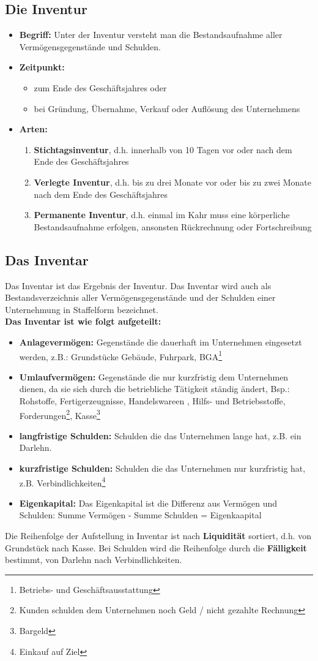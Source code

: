 \documentclass[a4paper,11pt]{scrartcl}	%
\begin{document}
	\subsection{Die Inventur}
		\begin{itemize}
			\item \textbf{Begriff:} Unter der Inventur versteht man die Bestandsaufnahme aller Vermögensgegenstände und Schulden.
			\item \textbf{Zeitpunkt:}
				\begin{itemize}
					\item zum Ende des Geschäftsjahres oder
					\item bei Gründung, Übernahme, Verkauf oder Auflösung des Unternehmens
				\end{itemize}				 
			\item \textbf{Arten:} 
				\begin{enumerate}
					\item \textbf{Stichtagsinventur}, d.h. innerhalb von 10 Tagen vor oder nach dem Ende des Geschäftsjahres
					\item \textbf{Verlegte Inventur}, d.h. bis zu drei Monate vor oder bis zu zwei Monate nach dem Ende des Geschäftsjahres
					\item \textbf{Permanente Inventur}, d.h. einmal im Kahr muss eine körperliche Bestandsaufnahme
					erfolgen, ansonsten Rückrechnung oder Fortschreibung
				\end{enumerate}
		\end{itemize}
		
	\subsection{Das Inventar}
	Das Inventar ist das Ergebnis der Inventur. Das Inventar wird auch als Bestandsverzeichnis aller
	Vermögensgegenstände  und der Schulden einer Unternehmung in Staffelform bezeichnet.\\[0.5cm]
	\textbf{Das Inventar ist wie folgt aufgeteilt:}
	
	\begin{itemize}
	\item \textbf{Anlagevermögen:} Gegenstände die dauerhaft im Unternehmen eingesetzt werden, z.B.: Grundstücke
	Gebäude, Fuhrpark, BGA\footnote{Betriebs- und Geschäftsausstattung}
	\item \textbf{Umlaufvermögen:} Gegenstände die nur kurzfristig dem Unternehmen dienen, da sie sich durch die
	betriebliche Tätigkeit ständig ändert, Bsp.: Rohstoffe, Fertigerzeugnisse, Handelswareen , Hilfs- und Betriebsstoffe,
	Forderungen\footnote{Kunden schulden dem Unternehmen noch Geld / nicht gezahlte Rechnung}, Kasse\footnote{Bargeld}
	\item \textbf{langfristige Schulden:} Schulden die das Unternehmen lange hat, z.B. ein Darlehn.
	\item \textbf{kurzfristige Schulden:} Schulden die das Unternehmen nur kurzfristig hat, z.B. Verbindlichkeiten\footnote{Einkauf auf Ziel}
	\item \textbf{Eigenkapital:} Das Eigenkapital ist die Differenz aus Vermögen und Schulden:
	Summe Vermögen - Summe Schulden = Eigenkaapital
	\end{itemize}
	
	Die Reihenfolge der Aufstellung in Inventar ist nach \textbf{Liquidität} sortiert, d.h. von Grundstück nach Kasse. 
	Bei Schulden wird die Reihenfolge durch die \textbf{Fälligkeit} bestimmt, von Darlehn nach Verbindlichkeiten.
	
\end{document}
